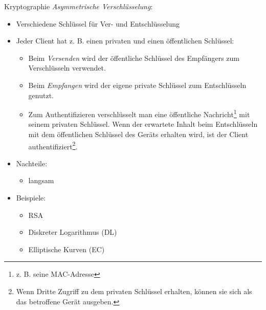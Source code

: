 \begin{bonus}{Kryptographie}
    \emph{Asymmetrische Verschlüsselung}:
    \begin{itemize}
        \item Verschiedene Schlüssel für Ver- und Entschlüsselung
        \item Jeder Client hat z. B. einen privaten und einen öffentlichen Schlüssel:
              \begin{itemize}
                  \item Beim \emph{Versenden} wird der öffentliche Schlüssel des Empfängers zum Verschlüsseln verwendet.
                  \item Beim \emph{Empfangen} wird der eigene private Schlüssel zum Entschlüsseln genutzt.
                  \item Zum Authentifizieren verschlüsselt man eine öffentliche Nachricht\footnote{z. B. seine MAC-Adresse} mit seinem privaten Schlüssel.
                        Wenn der erwartete Inhalt beim Entschlüsseln mit dem öffentlichen Schlüssel des Geräts erhalten wird, ist der Client authentifiziert\footnote{Wenn Dritte Zugriff zu dem privaten Schlüssel erhalten, können sie sich als das betroffene Gerät ausgeben.}.
              \end{itemize}
        \item Nachteile:
              \begin{itemize}
                  \item langsam
              \end{itemize}
        \item Beispiele:
              \begin{itemize}
                  \item RSA
                  \item Diskreter Logarithmus (DL)
                  \item Elliptische Kurven (EC)
              \end{itemize}
    \end{itemize}
\end{bonus}


